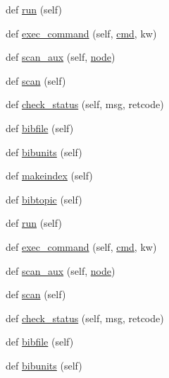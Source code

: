 \begin{DoxyCompactItemize}
def \hyperlink{classwaflib_1_1_tools_1_1tex_1_1tex_a9ca231d8975e3c1d5d3c9e455f31f892}{run} (self)
\item 
def \hyperlink{classwaflib_1_1_tools_1_1tex_1_1tex_af3bd4c7abea22374fe7cb435022880cd}{exec\+\_\+command} (self, \hyperlink{sndfile__play_8m_adfc5ba7e22f5e4a6221c12a70503bef3}{cmd}, kw)
\item 
def \hyperlink{classwaflib_1_1_tools_1_1tex_1_1tex_abd3866cf63c379f3bdd3e1568f32182a}{scan\+\_\+aux} (self, \hyperlink{structnode}{node})
\item 
def \hyperlink{classwaflib_1_1_tools_1_1tex_1_1tex_a9a1611c5caf6c5ef3bf0efbcd7cdb0b4}{scan} (self)
\item 
def \hyperlink{classwaflib_1_1_tools_1_1tex_1_1tex_ac5e3e5ed9bae28652ceec355e87c041b}{check\+\_\+status} (self, msg, retcode)
\item 
def \hyperlink{classwaflib_1_1_tools_1_1tex_1_1tex_a84f06095e6adb078c76849aaad9caaa7}{bibfile} (self)
\item 
def \hyperlink{classwaflib_1_1_tools_1_1tex_1_1tex_adc9975ca42cc99bdfed2453d0501deb7}{bibunits} (self)
\item 
def \hyperlink{classwaflib_1_1_tools_1_1tex_1_1tex_a037e014ad6faffb9d86bce5a13038776}{makeindex} (self)
\item 
def \hyperlink{classwaflib_1_1_tools_1_1tex_1_1tex_a91f60e48f7933bde8c62a1108c408f84}{bibtopic} (self)
\item 
def \hyperlink{classwaflib_1_1_tools_1_1tex_1_1tex_a9ca231d8975e3c1d5d3c9e455f31f892}{run} (self)
\item 
def \hyperlink{classwaflib_1_1_tools_1_1tex_1_1tex_af3bd4c7abea22374fe7cb435022880cd}{exec\+\_\+command} (self, \hyperlink{sndfile__play_8m_adfc5ba7e22f5e4a6221c12a70503bef3}{cmd}, kw)
\item 
def \hyperlink{classwaflib_1_1_tools_1_1tex_1_1tex_abd3866cf63c379f3bdd3e1568f32182a}{scan\+\_\+aux} (self, \hyperlink{structnode}{node})
\item 
def \hyperlink{classwaflib_1_1_tools_1_1tex_1_1tex_a9a1611c5caf6c5ef3bf0efbcd7cdb0b4}{scan} (self)
\item 
def \hyperlink{classwaflib_1_1_tools_1_1tex_1_1tex_ac5e3e5ed9bae28652ceec355e87c041b}{check\+\_\+status} (self, msg, retcode)
\item 
def \hyperlink{classwaflib_1_1_tools_1_1tex_1_1tex_a84f06095e6adb078c76849aaad9caaa7}{bibfile} (self)
\item 
def \hyperlink{classwaflib_1_1_tools_1_1tex_1_1tex_adc9975ca42cc99bdfed2453d0501deb7}{bibunits} (self)

\end{DoxyCompactItemize}
